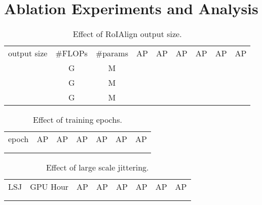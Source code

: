 \documentclass[10pt,twocolumn,letterpaper]{article}
\newcommand{\cmark}{\ding{51}}\newcommand{\xmark}{\ding{55}}
\begin{document}
\section{Ablation Experiments and Analysis}

\begin{table}[t]
\begin{minipage}[t]{1\linewidth}
\vspace{2mm}
\centering
\setlength{\tabcolsep}{3pt}
\footnotesize
\renewcommand{\arraystretch}{1.2}
\resizebox{1.0\linewidth}{!}
{
\begin{tabular}{l|c|c|cccccc}
   output size & \#FLOPs & \#params & AP & AP & AP & AP & AP & AP  \\
    \shline
    &  G &  M &  &  &  &  &  & \\ 
   \rowcolor{gray!10} &  G &  M &  &  &  &  &  &  \\
    &  G &  M &  &  &  &  &  &  \\
\end{tabular}
}
\caption{\small{{
Effect of RoIAlign output size.}}
}
\label{tab:roi_output_size}
\end{minipage}
\end{table}




\begin{table}[t]
\begin{minipage}[t]{1\linewidth}
\vspace{2mm}
\centering
\setlength{\tabcolsep}{9pt}
\footnotesize
\renewcommand{\arraystretch}{1.2}
\resizebox{1.0\linewidth}{!}
{
\begin{tabular}{c|cccccc}
   epoch  & AP & AP & AP & AP & AP & AP  \\
    \shline
   \rowcolor{gray!10} &  &  &  &  &  &  \\
     &  &  &  &  &  &  \\ 
\end{tabular}
}
\caption{\small{{
Effect of training epochs.}}
}
\label{tab:effect_training_epochs}
\end{minipage}
\end{table}




\begin{table}[t]
\begin{minipage}[t]{1\linewidth}
\vspace{2mm}
\centering
\setlength{\tabcolsep}{7pt}
\footnotesize
\renewcommand{\arraystretch}{1.2}
\resizebox{1.0\linewidth}{!}
{
\begin{tabular}{c|c|cccccc}
   LSJ   & GPU Hour& AP & AP & AP & AP & AP & AP  \\
    \shline
   \rowcolor{gray!10}\xmark &  &  &  &  &  &  &  \\
  \cmark  &  &  &  &  &  &  &  \\
\end{tabular}
}
\caption{\small{{
Effect of large scale jittering.}}
}
\label{tab:effect_lsj}
\end{minipage}
\end{table}
\end{document}
